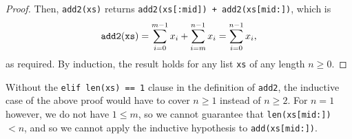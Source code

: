 \documentclass[a4paper,12pt]{article}
\begin{document}
\begin{enumerate}
\begin{proof}
Then, {\tt add2(xs)} returns {\tt add2(xs[:mid]) + add2(xs[mid:])}, which is
\[
    {\tt add2(xs)} = \sum_{i=0}^{m-1} x_i + \sum_{i=m}^{n-1} x_i = \sum_{i=0}^{n-1} x_i,
\]
as required. By induction, the result holds for any list {\tt xs} of any length
$n \geq 0$.
\end{proof}

Without the {\tt elif len(xs) == 1} clause in the definition of {\tt add2}, the
inductive case of the above proof would have to cover $n \geq 1$ instead of
$n \geq 2$. For $n = 1$ however, we do not have $1 \leq m$, so we cannot
guarantee that {\tt len(xs[mid:])} $< n$, and so we cannot apply the inductive
hypothesis to {\tt add(xs[mid:])}.
\end{enumerate}
\end{document}
